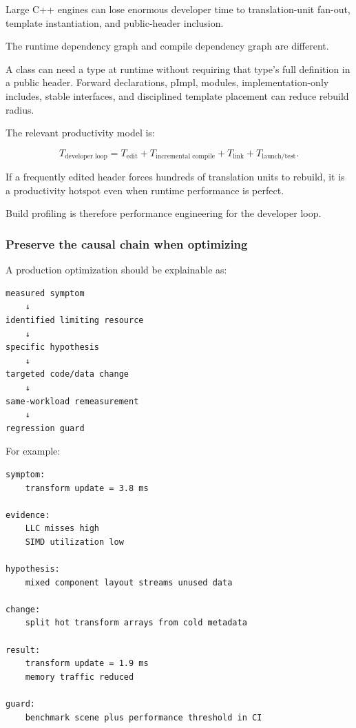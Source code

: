 Large C++ engines can lose enormous developer time to translation-unit fan-out, template instantiation, and public-header inclusion.

The runtime dependency graph and compile dependency graph are different.

A class can need a type at runtime without requiring that type's full definition in a public header. Forward declarations, pImpl, modules, implementation-only includes, stable interfaces, and disciplined template placement can reduce rebuild radius.

The relevant productivity model is:

\[
T_{\text{developer loop}}
=
T_{\text{edit}}
+
T_{\text{incremental compile}}
+
T_{\text{link}}
+
T_{\text{launch/test}}.
\]

If a frequently edited header forces hundreds of translation units to rebuild, it is a productivity hotspot even when runtime performance is perfect.

Build profiling is therefore performance engineering for the developer loop.

\subsubsection{Preserve the causal chain when optimizing}\label{01-foundations-i-ch005-preserve-the-causal-chain-when-optimizing}

\hypertarget{01-foundations-i-ch005-preserve-the-causal-chain-when-optimizing}{}

A production optimization should be explainable as:

\begin{verbatim}
measured symptom
    ↓
identified limiting resource
    ↓
specific hypothesis
    ↓
targeted code/data change
    ↓
same-workload remeasurement
    ↓
regression guard
\end{verbatim}

For example:

\begin{verbatim}
symptom:
    transform update = 3.8 ms

evidence:
    LLC misses high
    SIMD utilization low

hypothesis:
    mixed component layout streams unused data

change:
    split hot transform arrays from cold metadata

result:
    transform update = 1.9 ms
    memory traffic reduced

guard:
    benchmark scene plus performance threshold in CI
\end{verbatim}

